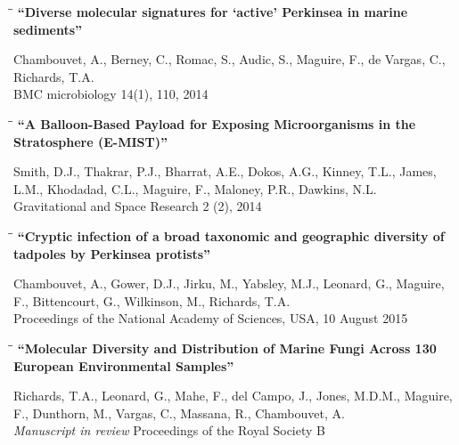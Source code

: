 \documentclass{res}
\begin{document}
\begin{resume}
\vspace{-0.2in}
\begin{tabbing}
   \hspace{2.3in}\= \hspace{2.6in}\= \kill
   {\bf ``Diverse molecular signatures for `active' Perkinsea in marine sediments''} 
   \end{tabbing}\vspace{-20pt}
     Chambouvet, A., Berney, C., Romac, S., Audic, S., Maguire, F., de Vargas, C., Richards, T.A.\\
     BMC microbiology 14(1), 110, 2014\\

\vspace{-0.2in}
\begin{tabbing}
   \hspace{2.3in}\= \hspace{2.6in}\= \kill
   {\bf ``A Balloon-Based Payload for Exposing Microorganisms in the Stratosphere (E-MIST)''}
   \end{tabbing}\vspace{-20pt}
Smith, D.J., Thakrar, P.J., Bharrat, A.E., Dokos, A.G., Kinney, T.L., James, L.M., Khodadad, C.L., Maguire, F., Maloney, P.R., Dawkins, N.L.\\
Gravitational and Space Research 2 (2), 2014\\

\vspace{-0.2in}
\begin{tabbing}
   \hspace{2.3in}\= \hspace{2.6in}\= \kill
   {\bf ``Cryptic infection of a broad taxonomic and geographic diversity of tadpoles by Perkinsea protists''}
   \end{tabbing}\vspace{-20pt}
   Chambouvet, A., Gower, D.J., Jirku, M., Yabsley, M.J., Leonard, G., Maguire, F., Bittencourt, G., Wilkinson, M., Richards, T.A.\\
Proceedings of the National Academy of Sciences, USA, 10 August 2015

\vspace{-0.1in}
\begin{tabbing}
   \hspace{2.3in}\= \hspace{2.6in}\= \kill
   {\bf ``Molecular Diversity and Distribution of Marine Fungi Across 130 European Environmental Samples''}
   \end{tabbing}\vspace{-20pt}
   Richards, T.A., Leonard, G., Mahe, F., del Campo, J., Jones, M.D.M., Maguire, F., Dunthorn, M., Vargas, C., Massana, R., Chambouvet, A.\\
\emph{Manuscript in review} Proceedings of the Royal Society B


\end{resume}
\end{document}
